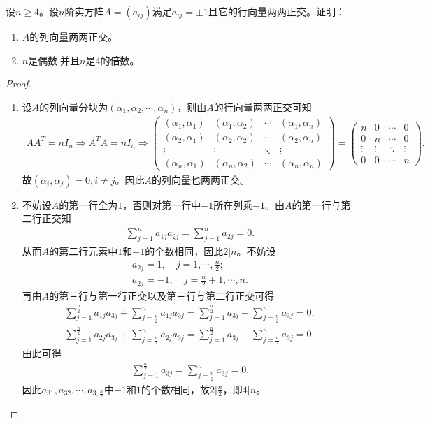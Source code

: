 \documentclass[../../main.tex]{subfiles}%
\begin{document}
\begin{example}
设$n \geqslant 4$。设$n$阶实方阵$A = (a_{ij})$满足$a_{ij} = \pm 1$且它的行向量两两正交。证明：
\begin{enumerate}[(1)]
\item $A$的列向量两两正交。

\item $n$是偶数,并且$n$是4的倍数。
\end{enumerate}
\end{example}
\begin{proof}
\begin{enumerate}[(1)]
\item 设$A$的列向量分块为$(\alpha_1,\alpha_2,\cdots,\alpha_n)$，则由$A$的行向量两两正交可知
\begin{align*}
AA^T=nI_n\Longrightarrow A^TA=nI_n\Longrightarrow \begin{pmatrix}
(\alpha_1,\alpha_1) & (\alpha_1,\alpha_2) & \cdots & (\alpha_1,\alpha_n) \\
(\alpha_2,\alpha_1) & (\alpha_2,\alpha_2) & \cdots & (\alpha_2,\alpha_n) \\
\vdots & \vdots & \ddots & \vdots \\
(\alpha_n,\alpha_1) & (\alpha_n,\alpha_2) & \cdots & (\alpha_n,\alpha_n)
\end{pmatrix} = \begin{pmatrix}
n & 0 & \cdots & 0 \\
0 & n & \cdots & 0 \\
\vdots & \vdots & \ddots & \vdots \\
0 & 0 & \cdots & n
\end{pmatrix}.
\end{align*}
故$(\alpha_i,\alpha_j)=0,i\ne j$。因此$A$的列向量也两两正交。

\item 不妨设$A$的第一行全为$1$，否则对第一行中$-1$所在列乘$-1$。由$A$的第一行与第二行正交知
\begin{align*}
\sum_{j=1}^n a_{1j}a_{2j} = \sum_{j=1}^n a_{2j} = 0.
\end{align*}
从而$A$的第二行元素中$1$和$-1$的个数相同，因此$2|n$。不妨设
\begin{gather*}
a_{2j}=1,\quad j=1,\cdots,\frac{n}{2}; \\
a_{2j}=-1,\quad j=\frac{n}{2}+1,\cdots,n.
\end{gather*}
再由$A$的第三行与第一行正交以及第三行与第二行正交可得
\begin{align*}
\sum_{j=1}^{\frac{n}{2}} a_{1j}a_{3j} + \sum_{j=\frac{n}{2}}^n a_{1j}a_{3j} = \sum_{j=1}^{\frac{n}{2}} a_{3j} + \sum_{j=\frac{n}{2}}^n a_{3j} = 0, \\
\sum_{j=1}^{\frac{n}{2}} a_{2j}a_{3j} + \sum_{j=\frac{n}{2}}^n a_{2j}a_{3j} = \sum_{j=1}^{\frac{n}{2}} a_{3j} - \sum_{j=\frac{n}{2}}^n a_{3j} = 0.
\end{align*}
由此可得
\begin{align*}
\sum_{j=1}^{\frac{n}{2}} a_{3j} = \sum_{j=\frac{n}{2}}^n a_{3j} = 0.
\end{align*}
因此$a_{31},a_{32},\cdots,a_{3,\frac{n}{2}}$中$-1$和$1$的个数相同，故$2|\frac{n}{2}$，即$4|n$。
\end{enumerate}
\end{proof}
\end{document}
